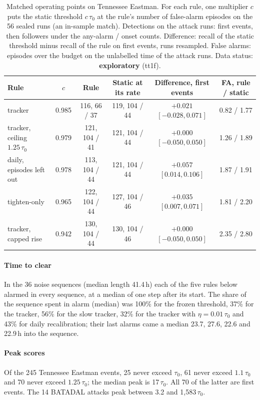 \documentclass[sigconf,review,anonymous]{acmart}
\begin{document}
\begin{table}[t]
\caption{Matched operating points on Tennessee Eastman. For each rule, one multiplier $c$ puts the static
threshold $c\,\tau_0$ at the rule's number of false-alarm episodes on the 56 sealed runs (an in-sample
match). Detections on the attack runs: first events, then followers under the any-alarm / onset counts.
Difference: recall of the static threshold minus recall of the rule on first events, runs resampled.
False alarms: episodes over the budget on the unlabelled time of the attack runs. Data status:
\textbf{exploratory} (tt1f).}
\label{tab:matched}
\small
\begin{tabularx}{\textwidth}{@{}Lccccc@{}}
\toprule
Rule & $c$ & Rule & Static at its rate & Difference, first events & FA, rule / static \\
\midrule
tracker & 0.985 & 116, 66 / 37 & 119, 104 / 44 & $+0.021$ $[-0.028, 0.071]$ & 0.82 / 1.77 \\
tracker, ceiling $1.25\,\tau_0$ & 0.979 & 121, 104 / 41 & 121, 104 / 44 & $+0.000$ $[-0.050, 0.050]$ & 1.26 / 1.89 \\
daily, episodes left out & 0.978 & 113, 104 / 44 & 121, 104 / 44 & $+0.057$ $[0.014, 0.106]$ & 1.87 / 1.91 \\
tighten-only & 0.965 & 122, 104 / 44 & 127, 104 / 46 & $+0.035$ $[0.007, 0.071]$ & 1.81 / 2.20 \\
tracker, capped rise & 0.942 & 130, 104 / 44 & 130, 104 / 46 & $+0.000$ $[-0.050, 0.050]$ & 2.35 / 2.80 \\
\bottomrule
\end{tabularx}
\end{table}

\paragraph{Time to clear}
In the 36 noise sequences (median length 41.4\,h) each of the five rules below alarmed in every sequence, at a median of one step
after its start. The share
of the sequence spent in alarm (median) was 100\% for the frozen threshold, 37\% for the tracker, 56\% for
the slow tracker, 32\% for the tracker with $\eta = 0.01\,\tau_0$ and 43\% for daily recalibration; their last
alarms came a median 23.7, 27.6, 22.6 and 22.9\,h into the sequence.

\paragraph{Peak scores}
Of the 245 Tennessee Eastman events, 25 never exceed $\tau_0$, 61 never exceed $1.1\,\tau_0$ and 70 never exceed
$1.25\,\tau_0$; the median peak is 17\,$\tau_0$. All 70 of the latter are first events. The
14 BATADAL attacks peak between 3.2 and 1,583\,$\tau_0$.
\end{document}
